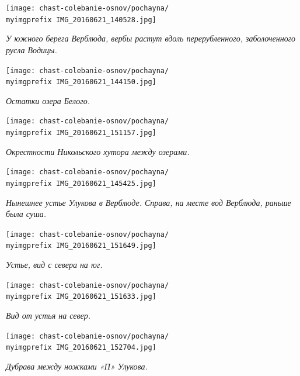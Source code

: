 \begin{center}
\texttt{[image: chast-colebanie-osnov/pochayna/\\myimgprefix IMG\_20160621\_140528.jpg]}

\textit{У южного берега Верблюда, вербы растут вдоль перерубленного, заболоченного русла Водицы.}
\end{center}

\newpage

\begin{center}
\texttt{[image: chast-colebanie-osnov/pochayna/\\myimgprefix IMG\_20160621\_144150.jpg]}

\textit{Остатки озера Белого.}
\end{center}


\begin{center}
\texttt{[image: chast-colebanie-osnov/pochayna/\\myimgprefix IMG\_20160621\_151157.jpg]}

\textit{Окрестности Никольского хутора между озерами.}
\end{center}

\newpage

\begin{center}
\texttt{[image: chast-colebanie-osnov/pochayna/\\myimgprefix IMG\_20160621\_145425.jpg]}

\textit{Нынешнее устье Улукова в Верблюде. Справа, на месте вод Верблюда, раньше была суша.}
\end{center}

\begin{center}
\texttt{[image: chast-colebanie-osnov/pochayna/\\myimgprefix IMG\_20160621\_151649.jpg]}

\textit{Устье, вид с севера на юг.}
\end{center}

\newpage

\begin{center}
\texttt{[image: chast-colebanie-osnov/pochayna/\\myimgprefix IMG\_20160621\_151633.jpg]}

\textit{Вид от устья на север.}
\end{center}

\begin{center}
\texttt{[image: chast-colebanie-osnov/pochayna/\\myimgprefix IMG\_20160621\_152704.jpg]}

\textit{Дубрава между ножками «П» Улукова.}
\end{center}

